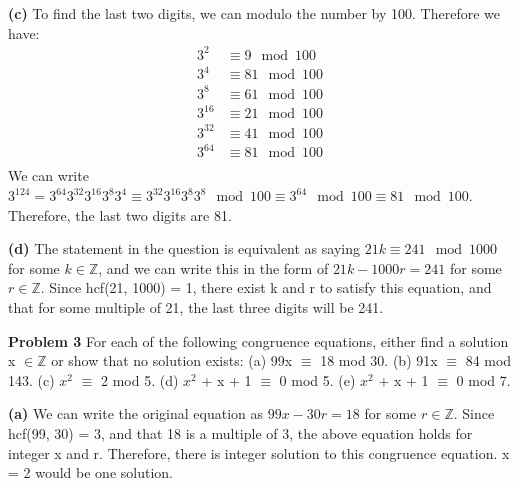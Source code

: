 \documentclass[12pt,letterpaper]{hmcpset}
\begin{document}
\begin{solution}\textbf{(c)} To find the last two digits, we can modulo the number by 100. Therefore we have:
\begin{align*}
3^{2}	&\equiv 9 \mod 100 \\
3^{4}	&\equiv 81 \mod 100 \\
3^{8}	&\equiv 61 \mod 100 \\
3^{16}	&\equiv 21 \mod 100 \\
3^{32}	&\equiv 41 \mod 100 \\
3^{64}	&\equiv 81 \mod 100 \\
\end{align*}
We can write $3^{124} = 3^{64}3^{32}3^{16}3^{8}3^{4} \equiv 3^{32}3^{16}3^{8}3^{8} \mod 100 \equiv 3^{64} \mod 100 \equiv 81\mod 100$. Therefore, the last two digits are 81.
\end{solution}

\begin{solution}\textbf{(d)} The statement in the question is equivalent as saying $21k \equiv 241 \mod 1000$ for some $k\in\mathbb{Z}$, and we can write this in the form of $21k - 1000r = 241$ for some $r\in\mathbb{Z}$. Since hcf(21, 1000) = 1, there exist k and r to satisfy this equation, and that for some multiple of 21, the last three digits will be 241.
\end{solution}
\begin{problem}\textbf{Problem 3}
\newline For each of the following congruence equations, either find a solution
x $\in \mathbb{Z}$ or show that no solution exists: 
\newline(a) 99x $\equiv$ 18 mod 30.
\newline(b) 91x $\equiv$ 84 mod 143.
\newline(c) $x^{2}$ $\equiv$ 2 mod 5.
\newline(d) $x^{2}$ + x + 1 $\equiv$ 0 mod 5. 
\newline(e) $x^{2}$ + x + 1 $\equiv$ 0 mod 7.
\end{problem}

\begin{solution} \textbf{(a)} We can write the original equation as $99x - 30r = 18$ for some $r \in\mathbb{Z}$. Since hcf(99, 30) = 3, and that 18 is a multiple of 3, the above equation holds for integer x and r. Therefore, there is integer solution to this congruence equation. x = 2 would be one solution.
\end{solution}
\end{document}
